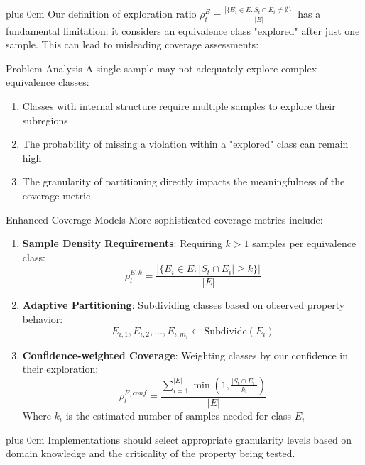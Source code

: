 \documentclass[conference]{IEEEtran}
\newcommand{\justifytext}{\leftskip=0pt \rightskip=0pt plus 0cm}
\begin{document}
\justifytext
Our definition of exploration ratio $\rho_t^E = \frac{|\{E_i \in E : S_t \cap E_i \neq \emptyset\}|}{|E|}$ has a fundamental limitation: it considers an equivalence class "explored" after just one sample. This can lead to misleading coverage assessments:

\begin{alertbox}{Problem Analysis}
A single sample may not adequately explore complex equivalence classes:
\begin{enumerate}
\item Classes with internal structure require multiple samples to explore their subregions
\item The probability of missing a violation within a "explored" class can remain high
\item The granularity of partitioning directly impacts the meaningfulness of the coverage metric
\end{enumerate}
\end{alertbox}

\begin{alertbox}{Enhanced Coverage Models}
More sophisticated coverage metrics include:
\begin{enumerate}
\item \textbf{Sample Density Requirements}: Requiring $k > 1$ samples per equivalence class:
   \begin{equation}
   \rho_t^{E,k} = \frac{|\{E_i \in E : |S_t \cap E_i| \geq k\}|}{|E|}
   \end{equation}

\item \textbf{Adaptive Partitioning}: Subdividing classes based on observed property behavior:
   \begin{equation}
   E_{i,1}, E_{i,2}, ..., E_{i,m_i} \leftarrow \text{Subdivide}(E_i)
   \end{equation}
   
\item \textbf{Confidence-weighted Coverage}: Weighting classes by our confidence in their exploration:
   \begin{equation}
   \rho_t^{E,conf} = \frac{\sum_{i=1}^{|E|} \min(1, \frac{|S_t \cap E_i|}{k_i})}{|E|}
   \end{equation}
   Where $k_i$ is the estimated number of samples needed for class $E_i$
\end{enumerate}
\end{alertbox}

\justifytext
Implementations should select appropriate granularity levels based on domain knowledge and the criticality of the property being tested.
\end{document}
